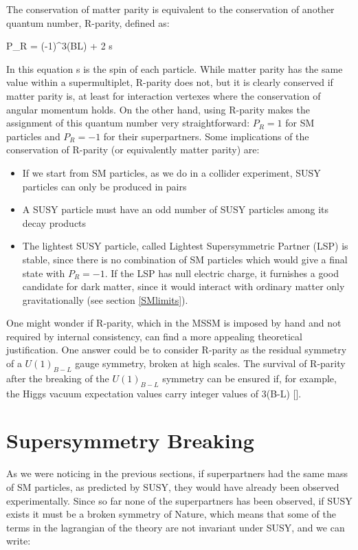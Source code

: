 The conservation of matter parity is equivalent to the conservation of another quantum number, R-parity, defined as:

\beq
P_R = (-1)^{3(BL) + 2 s}
\label{eq:defRparity}
\eeq

In this equation s is the spin of each particle. While matter parity has the same value within a supermultiplet, R-parity does not, but it is clearly conserved if matter parity is, at least for interaction vertexes where the conservation of angular momentum holds. On the other hand, using R-parity makes the assignment of this quantum number very straightforward: $P_R =1$ for SM particles and $P_R = -1$ for their superpartners.
Some implications of the conservation of R-parity (or equivalently matter parity) are:
\begin{itemize}
\item If we start from SM particles, as we do in a collider experiment, SUSY particles can only be produced in pairs
\item A SUSY particle must have an odd number of SUSY particles among its decay products 
\item The lightest SUSY particle, called Lightest Supersymmetric Partner (LSP) is stable, since there is no combination of SM particles which would give a final state with $P_R = -1$. If the LSP has null electric charge, it furnishes a good candidate for dark matter, since it would interact with ordinary matter only gravitationally (see section \ref{SMlimits}). 
\end{itemize}

One might wonder if R-parity, which in the MSSM is imposed by hand and not required by internal consistency, can find a more appealing theoretical justification. One answer could be to consider R-parity as the residual symmetry of a $U(1)_{B-L}$ gauge symmetry, broken at high scales. The survival of R-parity after the breaking of the $U(1)_{B-L}$ symmetry can be ensured if, for example, the Higgs vacuum expectation values carry integer values of 3(B-L) [\cite{martin:Rparity}].


\section{Supersymmetry Breaking}
As we were noticing in the previous sections, if superpartners had the same mass of SM particles, as predicted by SUSY, they would have already been observed experimentally. Since so far none of the superpartners has been observed, if SUSY exists it must be a broken symmetry of Nature, which means that some of the terms in the lagrangian of the theory are not invariant under SUSY, and we can write:


